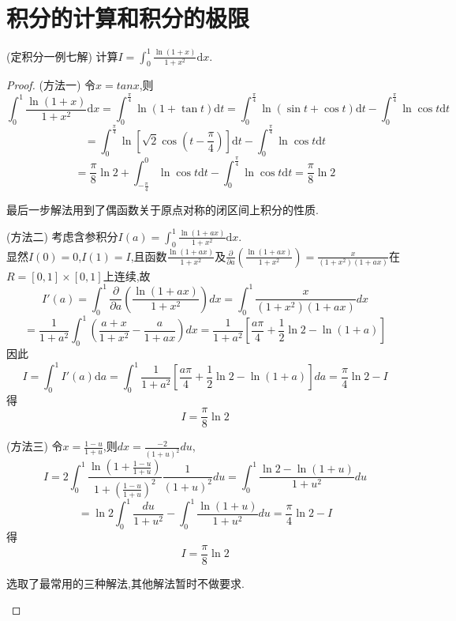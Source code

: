 \chapter{积分的计算和积分的极限}

\begin{example}
	(定积分一例七解) 计算$
		I=\int_0^1{\frac{\ln \left( 1+x \right)}{1+x^2}\text{d}x}
	$.
\end{example}

\begin{proof}
	(方法一) 令$x=tanx$,则
	$$
		\int_0^1{\frac{\ln \left( 1+x \right)}{1+x^2}\text{d}x}=\int_0^{\frac{\pi}{4}}{\ln \left( 1+\tan t \right) \text{d}t}=\int_0^{\frac{\pi}{4}}{\ln \left( \sin t+\cos t \right) \text{d}t}-\int_0^{\frac{\pi}{4}}{\ln\cos t\text{d}t}
	$$
	$$
		=\int_0^{\frac{\pi}{4}}{\ln \left[ \sqrt{2}\cos \left( t-\frac{\pi}{4} \right) \right] \text{d}t-\int_0^{\frac{\pi}{4}}{\ln\cos t\text{d}t}}
	$$
	$$
		=\frac{\pi}{8}\ln 2+\int_{-\frac{\pi}{4}}^0{\ln\cos t\text{d}t}-\int_0^{\frac{\pi}{4}}{\ln\cos t\text{d}t}=\frac{\pi}{8}\ln 2
	$$
	\begin{remark}
		最后一步解法用到了偶函数关于原点对称的闭区间上积分的性质.
	\end{remark}
	(方法二) 考虑含参积分$
		I\left( a \right) =\int_0^1{\frac{\ln \left( 1+ax \right)}{1+x^2}\text{d}x}
	$.\\
	显然$I(0)=0$,$ I(1)=I$,且函数$
		\frac{\ln \left( 1+ax \right)}{1+x^2}
	$及$
		\frac{\partial}{\partial a}\left( \frac{\ln \left( 1+ax \right)}{1+x^2} \right) =\frac{x}{\left( 1+x^2 \right) \left( 1+ax \right)}
	$在$R=[0,1]\times [0,1]$上连续,故
	$$
		I'\left( a \right) =\int_0^1{\frac{\partial}{\partial a}\left( \frac{\ln \left( 1+ax \right)}{1+x^2} \right) dx}=\int_0^1{\frac{x}{\left( 1+x^2 \right) \left( 1+ax \right)}dx}
	$$
	$$
		=\frac{1}{1+a^2}\int_0^1{\left( \frac{a+x}{1+x^2}-\frac{a}{1+ax} \right) dx}=\frac{1}{1+a^2}\left[ \frac{a\pi}{4}+\frac{1}{2}\ln 2-\ln \left( 1+a \right) \right]
	$$
	因此
	$$
		I=\int_0^1{I'\left( a \right) \text{d}a=}\int_0^1{\frac{1}{1+a^2}\left[ \frac{a\pi}{4}+\frac{1}{2}\ln 2-\ln \left( 1+a \right) \right] da}=\frac{\pi}{4}\ln 2-I
	$$
	得
	$$
		I=\frac{\pi}{8}\ln 2
	$$

	(方法三) 令$
		x=\frac{1-u}{1+u}
	$,则$
		dx=\frac{-2}{\left( 1+u \right) ^2}du
	$,
	$$
		I=2\int_0^1{\frac{\ln \left( 1+\frac{1-u}{1+u} \right)}{1+\left( \frac{1-u}{1+u} \right) ^2}\frac{1}{\left( 1+u \right) ^2}du}=\int_0^1{\frac{\ln 2-\ln \left( 1+u \right)}{1+u^2}du}
	$$
	$$
		=\ln 2\int_0^1{\frac{du}{1+u^2}}-\int_0^1{\frac{\ln \left( 1+u \right)}{1+u^2}du}=\frac{\pi}{4}\ln 2-I
	$$
	得
	$$
		I=\frac{\pi}{8}\ln 2
	$$
	\begin{remark}
		选取了最常用的三种解法,其他解法暂时不做要求.
	\end{remark}
\end{proof}
